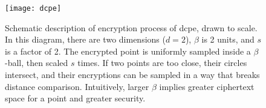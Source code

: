 \begin{figure}[h]
	\centering
	\texttt{[image: dcpe]}
	\caption[Schematic description of \acrshort{dcpe}]{
		Schematic description of encryption process of \acrshort{dcpe}, drawn to scale.
		In this diagram, there are two dimensions ($d = 2$), $\beta$ is 2 units, and $s$ is a factor of 2.
		The encrypted point is uniformly sampled inside a $\beta$-ball, then scaled $s$ times.
		If two points are too close, their circles intersect, and their encryptions can be sampled in a way that breaks distance comparison.
		Intuitively, larger $\beta$ implies greater ciphertext space for a point and greater security.
	}\label{figure:dcpe}
\end{figure}

